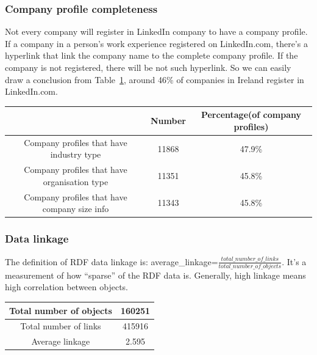 \subsubsection{Company profile completeness}

Not every company will register in LinkedIn company to have a company profile. If a company in a person's work experience registered on LinkedIn.com, there's a hyperlink that link the company name to the complete company profile. If the company is not registered, there will be not such hyperlink. So we can easily draw a conclusion from Table~\ref{tab:ComPercent}, around 46\% of companies in Ireland register in LinkedIn.com.

\begin{table}[H]
    \begin{tabular}{|c|c|c|}
    \hline
    ~                                            & Number & Percentage(of company profiles) \\ \hline
    Company profiles that have industry type     & 11868  & 47.9\%                             \\ \hline
    Company profiles that have organisation type & 11351  & 45.8\%                             \\ \hline
    Company profiles that have company size info & 11343  & 45.8\%                             \\ \hline
    \end{tabular}
    \label{tab:ComPercent}
\end{table}

\subsubsection{Data linkage}

The definition of RDF data linkage is: average\_linkage=$\frac{total\_number\_of\_links}{total\_number\_of\_objects}$. It's a measurement of how ``sparse'' of the RDF data is. Generally, high linkage means high correlation between objects.

\begin{table}[H]
    \begin{tabular}{|c|c|}
    \hline
    Total number of objects & 160251 \\ \hline
    Total number of links   & 415916 \\ \hline
    Average linkage                 & 2.595  \\ \hline
    \end{tabular}
\end{table}

